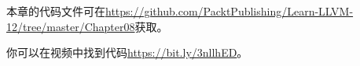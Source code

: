 本章的代码文件可在\url{https://github.com/PacktPublishing/Learn-LLVM-12/tree/master/Chapter08}获取。\par

你可以在视频中找到代码\url{https://bit.ly/3nllhED}。\par